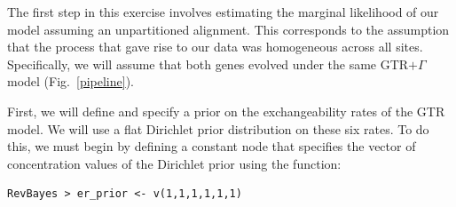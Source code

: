 The first step in this exercise involves estimating the marginal likelihood of our model assuming an unpartitioned alignment. 
This corresponds to the assumption that the process that gave rise to our data was homogeneous across all sites. 
Specifically, we will assume that both genes evolved under the same GTR$+\Gamma$ model (Fig.~\ref{pipeline}). 



%
%
%

First, we will define and specify a prior on the exchangeability rates of the GTR model. We will use a flat Dirichlet prior distribution on these six rates. To do this, we must begin by defining a constant node that specifies the vector of concentration values of the Dirichlet prior using the  function:
{\tt \begin{snugshade*}
\begin{lstlisting}
RevBayes > er_prior <- v(1,1,1,1,1,1) 
\end{lstlisting}
\end{snugshade*}}


